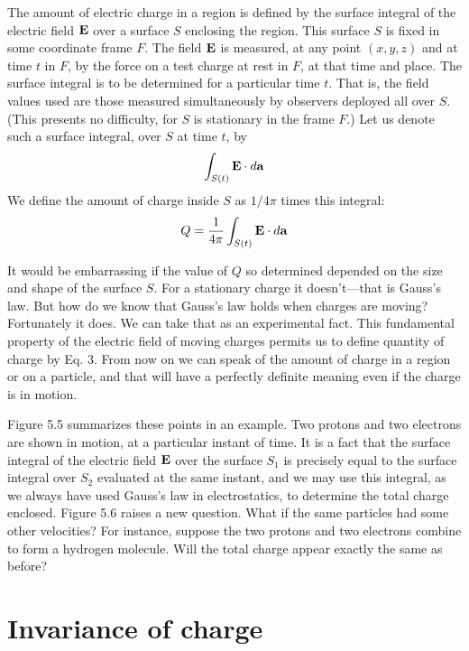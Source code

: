 The amount of electric charge in a region is defined by the surface
integral of the electric field $\mathbf{E}$ over a surface $S$ enclosing the region.
This surface $S$ is fixed in some coordinate frame $F$. The field $\mathbf{E}$ is
measured, at any point $(x,y,z)$ and at time $t$ in $F$, by the force on a
test charge at rest in $F$, at that time and place. The surface integral
is to be determined for a particular time $t$. That is, the field values
used are those measured simultaneously by observers deployed all
over $S$. (This presents no difficulty, for $S$ is stationary in the frame $F$.)
Let us denote such a surface integral, over $S$ at time $t$, by
\begin{equation}
  \int_{S(t)} \mathbf{E}\cdot d\mathbf{a}
\end{equation}
We define the amount of charge inside $S$ as $1/4\pi$ times this integral:
\begin{equation}
  Q = \frac{1}{4\pi} \int_{S(t)} \mathbf{E}\cdot d\mathbf{a}
\end{equation}

It would be embarrassing if the value of $Q$ so determined depended
on the size and shape of the surface $S$. For a stationary charge it
doesn't---that is Gauss's law. But how do we know that Gauss's law
holds when charges are moving? Fortunately it does. We can take
that as an experimental fact. This fundamental property of the
electric field of moving charges permits us to define quantity of
charge by Eq. 3. From now on we can speak of the amount of charge
in a region or on a particle, and that will have a perfectly definite
meaning even if the charge is in motion.

Figure 5.5 summarizes these points in an example. Two protons
and two electrons are shown in motion, at a particular instant of
time. It is a fact that the surface integral of the electric field $\mathbf{E}$ over
the surface $S_1$ is precisely equal to the surface integral over $S_2$
evaluated at the same instant, and we may use this integral, as we
always have used Gauss's law in electrostatics, to determine the total
charge enclosed. Figure 5.6 raises a new question. What if the
same particles had some other velocities? For instance, suppose the
two protons and two electrons combine to form a hydrogen molecule.
Will the total charge appear exactly the same as before?

\section{Invariance of charge}

